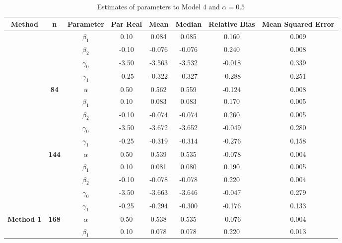 \begin{table}[h]

\caption{\label{tab:Est_model_4_Alpha0.5}Estimates of parameters to Model 4 and $\alpha=0.5$}
\centering
\begin{tabular}[t]{>{}c>{}ccccccc}
\toprule
Method & n & Parameter & Par Real & Mean & Median & Relative Bias & Mean Squared Error\\
\midrule
 &  & $\beta_1$ & 0.10 & 0.084 & 0.085 & 0.160 & 0.009\\

 &  & $\beta_2$ & -0.10 & -0.076 & -0.076 & 0.240 & 0.008\\

 &  & $\gamma_0$ & -3.50 & -3.563 & -3.532 & -0.018 & 0.339\\

 &  & $\gamma_1$ & -0.25 & -0.322 & -0.327 & -0.288 & 0.251\\

 & \multirow{-5}{*}{\centering\arraybackslash \textbf{84}} & $\alpha$ & 0.50 & 0.562 & 0.559 & -0.124 & 0.008\\

 &  & $\beta_1$ & 0.10 & 0.083 & 0.083 & 0.170 & 0.005\\

 &  & $\beta_2$ & -0.10 & -0.074 & -0.074 & 0.260 & 0.005\\

 &  & $\gamma_0$ & -3.50 & -3.672 & -3.652 & -0.049 & 0.280\\

 &  & $\gamma_1$ & -0.25 & -0.319 & -0.314 & -0.276 & 0.158\\

 & \multirow{-5}{*}{\centering\arraybackslash \textbf{144}} & $\alpha$ & 0.50 & 0.539 & 0.535 & -0.078 & 0.004\\

 &  & $\beta_1$ & 0.10 & 0.081 & 0.080 & 0.190 & 0.005\\

 &  & $\beta_2$ & -0.10 & -0.078 & -0.078 & 0.220 & 0.004\\

 &  & $\gamma_0$ & -3.50 & -3.663 & -3.646 & -0.047 & 0.279\\

 &  & $\gamma_1$ & -0.25 & -0.294 & -0.300 & -0.176 & 0.133\\

\multirow{-15}{*}{\centering\arraybackslash \textbf{Method 1}} & \multirow{-5}{*}{\centering\arraybackslash \textbf{168}} & $\alpha$ & 0.50 & 0.538 & 0.535 & -0.076 & 0.004\\
\cmidrule{1-8}
 &  & $\beta_1$ & 0.10 & 0.078 & 0.078 & 0.220 & 0.013\\


\end{tabular}
\end{table}
